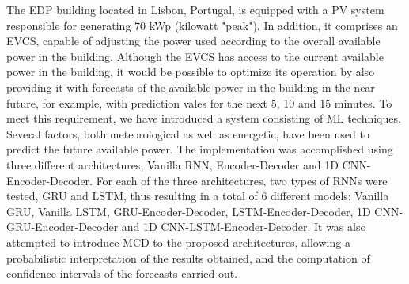 \noindent The \ac{EDP} building located in Lisbon, Portugal, is equipped with a \ac{PV} system responsible for generating 70 kWp (kilowatt "peak"). In addition, it comprises an \ac{EVCS}, capable of adjusting the power used according to the overall available power in the building. Although the \ac{EVCS} has access to the current available power in the building, it would be possible to optimize its operation by also providing it with forecasts of the available power in the building in the near future, for example, with prediction vales for the next 5, 10 and 15 minutes. To meet this requirement, we have introduced a system consisting of \ac{ML} techniques. Several factors, both meteorological as well as energetic, have been used to predict the future available power. The implementation was accomplished using three different architectures, Vanilla \ac{RNN}, Encoder-Decoder and \ac{1D CNN}-Encoder-Decoder. For each of the three architectures, two types of \ac{RNN}s were tested, \ac{GRU} and \ac{LSTM}, thus resulting in a total of 6 different models: Vanilla \ac{GRU}, Vanilla \ac{LSTM}, \ac{GRU}-Encoder-Decoder, \ac{LSTM}-Encoder-Decoder, \ac{1D CNN}-\ac{GRU}-Encoder-Decoder and \ac{1D CNN}-\ac{LSTM}-Encoder-Decoder. It was also attempted to introduce \ac{MCD} to the proposed architectures, allowing a probabilistic interpretation of the results obtained, and the computation of confidence intervals of the forecasts carried out. 
